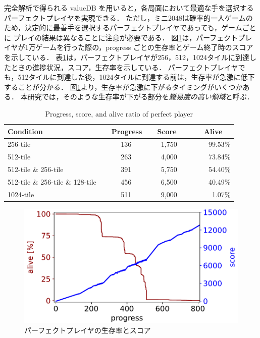 完全解析で得られる valueDB を用いると，各局面において最適な手を選択するパーフェクトプレイヤを実現できる．
ただし，ミニ2048は確率的一人ゲームのため，決定的に最善手を選択するパーフェクトプレイヤであっても，ゲームごとに
プレイの結果は異なることに注意が必要である．
図\ref{pp-play}は，パーフェクトプレイヤが1万ゲームを行った際の，progress ごとの生存率とゲーム終了時のスコアを示している．
表\ref{pp-specific}は，パーフェクトプレイヤが256，512，1024タイルに到達したときの進捗状況，スコア，生存率を示している．
パーフェクトプレイヤでも，512タイルに到達した後，1024タイルに到達する前は，生存率が急激に低下することが分かる．
図\ref{pp-play}より，生存率が急激に下がるタイミングがいくつかある．
本研究では，そのような生存率が下がる部分を\emph{難易度の高い領域}と呼ぶ．
\begin{table}[t]
  \caption{Progress, score, and alive ratio of perfect player}
  \label{pp-specific}
  \centering\begin{tabular}{lrrr}
   \hline\hline
   Condition & ~~Progress & ~~Score~ & ~~~~Alive~~ \\
   \hline
  256-tile                          & 136~~~ & 1,750~ & 99.53\% \\
  512-tile                          & 263~~~ & 4,000~ & 73.84\% \\
  512-tile \& 256-tile              & 391~~~ & 5,750~ & 54.40\% \\
  512-tile \& 256-tile \& 128-tile  & 456~~~ & 6,500~ & 40.49\% \\
  1024-tile                         & 511~~~ & 9,000~ &  1.07\% \\
   \hline
\end{tabular}
\end{table}

\begin{figure}[t]
  \centering\includegraphics[width=\linewidth]{pdf/pp-play.pdf}
  \caption{パーフェクトプレイヤの生存率とスコア \cite{TeKM23}}
  \label{pp-play}
\end{figure}

